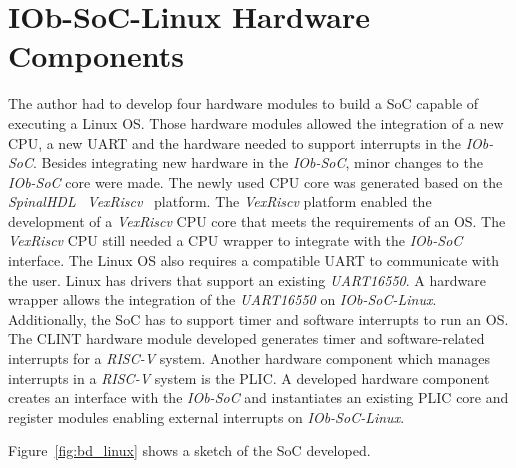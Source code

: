 
\section{IOb-SoC-Linux Hardware Components}
\label{sec:hardware_developed}

The author had to develop four hardware modules to build a SoC capable of executing a Linux OS. Those hardware modules allowed the integration of a new CPU, a new UART and the hardware needed to support interrupts in the \textit{IOb-SoC}. Besides integrating new hardware in the \textit{IOb-SoC}, minor changes to the \textit{IOb-SoC} core were made. The newly used CPU core was generated based on the \textit{SpinalHDL}~\cite{papon2017spinalhdl} \textit{VexRiscv}~\cite{vexriscv} platform. The \textit{VexRiscv} platform enabled the development of a \textit{VexRiscv} CPU core that meets the requirements of an OS. The \textit{VexRiscv} CPU still needed a CPU wrapper to integrate with the \textit{IOb-SoC} interface. The Linux OS also requires a compatible UART to communicate with the user. Linux has drivers that support an existing \textit{UART16550}. A hardware wrapper allows the integration of the \textit{UART16550} on \textit{IOb-SoC-Linux}. Additionally, the SoC has to support timer and software interrupts to run an OS. The CLINT hardware module developed generates timer and software-related interrupts for a \textit{RISC-V} system. Another hardware component which manages interrupts in a \textit{RISC-V} system is the PLIC. A developed hardware component creates an interface with the \textit{IOb-SoC} and instantiates an existing PLIC core and register modules enabling external interrupts on \textit{IOb-SoC-Linux}. 

Figure~\ref{fig:bd_linux} shows a sketch of the SoC developed.


